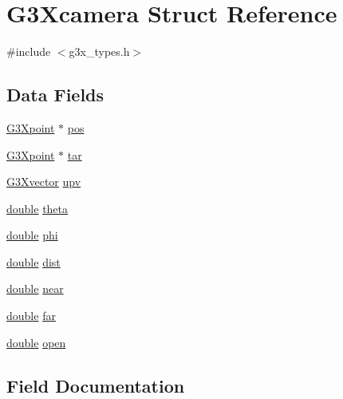 \hypertarget{struct_g3_xcamera}{}\section{G3\+Xcamera Struct Reference}
\label{struct_g3_xcamera}


{\ttfamily \#include $<$g3x\+\_\+types.\+h$>$}

\subsection*{Data Fields}
\begin{DoxyCompactItemize}
\item 
\hyperlink{g3x__types_8h_a656d1bc95bdef5a54decde84cfe9f60a}{G3\+Xpoint} $\ast$ \hyperlink{struct_g3_xcamera_a89b7ccb5e6816ed54f59a9617a904f87}{pos}
\item 
\hyperlink{g3x__types_8h_a656d1bc95bdef5a54decde84cfe9f60a}{G3\+Xpoint} $\ast$ \hyperlink{struct_g3_xcamera_a9e81d1c93b5922975305fc19baee7b2e}{tar}
\item 
\hyperlink{g3x__types_8h_a6181ad7c7bac1d7942ab3944bae2b8a1}{G3\+Xvector} \hyperlink{struct_g3_xcamera_adc4802615d8f0d628d8b2986f08bbce8}{upv}
\item 
\hyperlink{g3x__transfo_8h_a89b2b23e407882a535d835574a7912e1}{double} \hyperlink{struct_g3_xcamera_aca81c35c21e3a5f7f3a8d24504e76664}{theta}
\item 
\hyperlink{g3x__transfo_8h_a89b2b23e407882a535d835574a7912e1}{double} \hyperlink{struct_g3_xcamera_adae8d8a6ff28515e505bb1c07f2b33c8}{phi}
\item 
\hyperlink{g3x__transfo_8h_a89b2b23e407882a535d835574a7912e1}{double} \hyperlink{struct_g3_xcamera_accf93555161c9eedf006462a228af523}{dist}
\item 
\hyperlink{g3x__transfo_8h_a89b2b23e407882a535d835574a7912e1}{double} \hyperlink{struct_g3_xcamera_a3b79efd873843125dabba312ddde65a3}{near}
\item 
\hyperlink{g3x__transfo_8h_a89b2b23e407882a535d835574a7912e1}{double} \hyperlink{struct_g3_xcamera_add1a608db25e8e3befb6775a16867611}{far}
\item 
\hyperlink{g3x__transfo_8h_a89b2b23e407882a535d835574a7912e1}{double} \hyperlink{struct_g3_xcamera_a4ef60f0d779b1928bb150cab69726bab}{open}
\end{DoxyCompactItemize}


\subsection{Field Documentation}
\mbox{\label{struct_g3_xcamera_accf93555161c9eedf006462a228af523}} 
